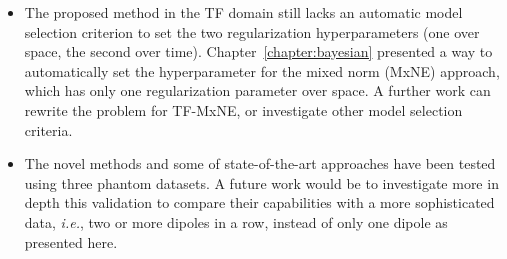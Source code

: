 \begin{itemize}
\item The proposed method in the TF domain still lacks an automatic model selection criterion to set the two regularization hyperparameters (one over space, the second over time). Chapter~\ref{chapter:bayesian} presented a way to automatically set the hyperparameter for the mixed norm (MxNE) approach, which has only one regularization parameter over space. A further work can rewrite the problem for TF-MxNE, or investigate other model selection criteria.

\item The novel methods and some of state-of-the-art approaches have been tested using three phantom datasets. A future work would be to investigate more in depth this validation to compare their capabilities with a more sophisticated data, \textit{i.e.}, two or more dipoles in a row, instead of only one dipole as presented here.
\end{itemize} 
